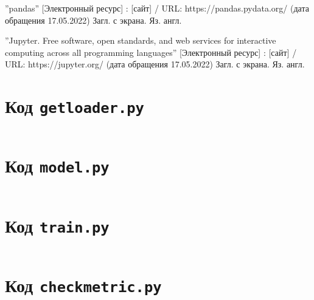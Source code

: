 \documentclass[bachelor, och, coursework]{SCWorks}
\begin{document}
\begin{thebibliography}{99}
     ''pandas'' [Электронный ресурс] : [сайт] / URL:
    https://pandas.pydata.org/ (дата обращения 17.05.2022) Загл. с экрана. Яз.
    англ.

     ''Jupyter. Free software, open standards, and web
    services for interactive computing across all programming languages''
    [Электронный ресурс] : [сайт] / URL: https://jupyter.org/ (дата обращения
    17.05.2022) Загл. с экрана. Яз. англ.

\end{thebibliography}

\appendix

    \section{Код \texttt{getloader.py}}
    \inputminted{py}{model-ver-2/getloader.py}

    \section{Код \texttt{model.py}}
    \inputminted{py}{model-ver-2/model.py}

    \section{Код \texttt{train.py}}
    \inputminted{py}{model-ver-2/train.py}

    \section{Код \texttt{checkmetric.py}}
    \inputminted{py}{model-ver-2/checkmetric.py}
\end{document}
